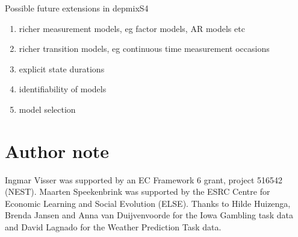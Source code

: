 \documentclass[a4paper,12pt,man,english]{apa} %
\begin{document}
Possible future extensions in depmixS4
\begin{enumerate}
	\item richer measurement models, eg factor models, AR models etc
	\item richer transition models, eg continuous time measurement occasions
	\item explicit state durations
	\item identifiability of models
	\item model selection
\end{enumerate}





\section*{Author note}

Ingmar Visser was supported by an EC Framework 6 grant, project 516542
(NEST).  Maarten Speekenbrink was supported by the ESRC Centre for
Economic Learning and Social Evolution (ELSE).  Thanks to Hilde
Huizenga, Brenda Jansen and Anna van Duijvenvoorde for the Iowa
Gambling task data and David Lagnado for the Weather Prediction Task
data.


\end{document}

